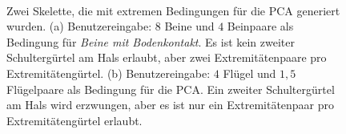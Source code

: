 \begin{figure}
 ~
 
 \caption{Zwei Skelette, die mit extremen Bedingungen für die PCA generiert wurden. (a) Benutzereingabe: $8$ Beine und $4$ Beinpaare als Bedingung für \emph{Beine mit Bodenkontakt}. Es ist kein zweiter Schultergürtel am Hals erlaubt, aber zwei Extremitätenpaare pro Extremitätengürtel. (b) Benutzereingabe: $4$ Flügel und $1{,}5$ Flügelpaare als Bedingung für die PCA. Ein zweiter Schultergürtel am Hals wird erzwungen, aber es ist nur ein Extremitätenpaar pro Extremitätengürtel erlaubt.}
 \label{more_extremities}
\end{figure}

